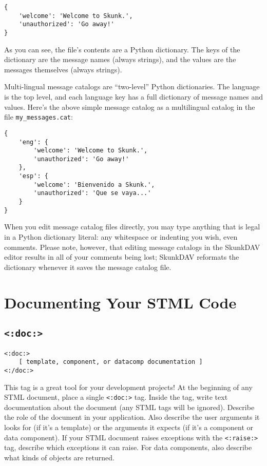 \documentclass{manual}
\begin{document}
{{\begin{verbatim}
{
    'welcome': 'Welcome to Skunk.',
    'unauthorized': 'Go away!'
}
\end{verbatim}


As you can see, the file's contents are a
Python dictionary. The keys of the dictionary
are the message names (always strings), and
the values are the messages themselves (always
strings).

Multi-lingual message catalogs are ``two-level''
Python dictionaries. The language is the top level,
and each language key has a full dictionary of 
message names and values. Here's the above simple
message catalog as a multilingual catalog in
the file \texttt{my_messages.cat}:

\begin{verbatim}
{
    'eng': {
        'welcome': 'Welcome to Skunk.',
        'unauthorized': 'Go away!'
    },
    'esp': {
        'welcome': 'Bienvenido a Skunk.',
        'unauthorized': 'Que se vaya...'
    }
}
\end{verbatim}


When you edit message catalog files directly,
you may type anything that is legal in a Python
dictionary literal: any whitespace or indenting you wish,
even comments. Please note, however, that editing
message catalogs in the SkunkDAV editor results in 
all of your comments being lost; SkunkDAV
reformats the dictionary whenever it saves the
message catalog file.

\chapter{Documenting Your STML Code}
\label{stmlrefmisc}



\section{\texttt{<:doc:>}}
\label{tagdoc}

\begin{verbatim}<:doc:>
    [ template, component, or datacomp documentation ]
<:/doc:>
\end{verbatim}


This tag is a great tool for your development projects!
At the beginning of any STML document,
place a single \texttt{<:doc:>} tag. Inside the tag,
write text documentation about the document (any STML tags will
be ignored). Describe the role of the document in your application.
Also describe the user arguments it looks for (if it's a template)
or the arguments it expects (if it's a component or data component).
If your STML document raises exceptions with the \texttt{<:raise:>}
tag, describe which exceptions it can raise.
For data components, also describe what kinds of objects are returned.

}}
\end{document}

